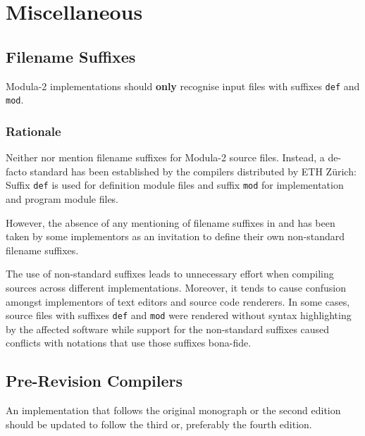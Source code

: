 \documentclass[10pt,a4paper]{article}
\begin{document}
\section{Miscellaneous}

\subsection{Filename Suffixes}

Modula-2 implementations should \textbf{only} recognise input files with
suffixes \verb|def| and \verb|mod|.

\subsubsection{Rationale}

Neither \cite{Wirth78} nor \cite{Wirth88} mention filename suffixes for
Modula-2 source files. Instead, a de-facto standard has been established by
the compilers distributed by ETH Z\"{u}rich: Suffix \verb|def| is used for
definition module files and suffix \verb|mod| for implementation and program
module files.

However, the absence of any mentioning of filename suffixes in \cite{Wirth78}
and \cite{Wirth88} has been taken by some implementors as an invitation to
define their own non-standard filename suffixes.

The use of non-standard suffixes leads to unnecessary effort when compiling
sources across different implementations. Moreover, it tends to cause confusion
amongst implementors of text editors and source code renderers. In some cases,
source files with suffixes \verb|def| and \verb|mod| were rendered without
syntax highlighting by the affected software while support for the non-standard
suffixes caused conflicts with notations that use those suffixes bona-fide.


\subsection{Pre-Revision Compilers}
An implementation that follows the original monograph \cite{Wirth78} or the
second edition \cite{Wirth83} should be updated to follow the third
\cite{Wirth85} or, preferably the fourth \cite{Wirth88} edition.
\end{document}
